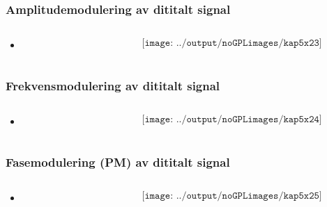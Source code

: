 \documentclass[aspectratio=169,xcolor=dvipsnames]{beamer}
\begin{document}
\begin{frame}
	\frametitle{Amplitudemodulering av dititalt signal}
	\begin{columns}
		\begin{column}{0.5\textwidth}

			\begin{itemize}
				\item      
			\end{itemize}

			
		\end{column}

		\begin{column}{0.5\textwidth}
	$$\texttt{[image: ../output/noGPLimages/kap5x23]}$$
		\end{column}
	\end{columns}
\end{frame}
\begin{frame}
	\frametitle{Frekvensmodulering av dititalt signal}
	\begin{columns}
		\begin{column}{0.5\textwidth}

			\begin{itemize}
				\item      
			\end{itemize}

			
		\end{column}

		\begin{column}{0.5\textwidth}
	$$\texttt{[image: ../output/noGPLimages/kap5x24]}$$
		\end{column}
	\end{columns}
\end{frame}
\begin{frame}
	\frametitle{Fasemodulering (PM) av dititalt signal}
	\begin{columns}
		\begin{column}{0.5\textwidth}

			\begin{itemize}
				\item      
			\end{itemize}

			
		\end{column}

		\begin{column}{0.5\textwidth}
	$$\texttt{[image: ../output/noGPLimages/kap5x25]}$$
		\end{column}
	\end{columns}
\end{frame}
\end{document}
